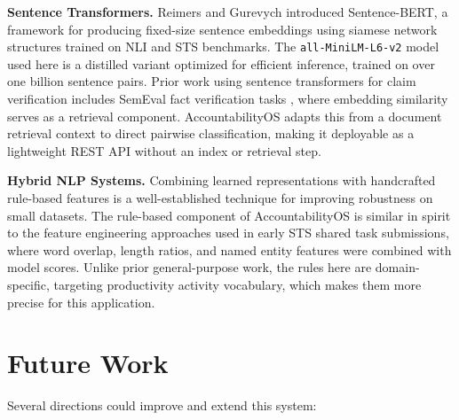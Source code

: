 \documentclass[11pt]{article}
\begin{document}
\textbf{Sentence Transformers.} Reimers and Gurevych \cite{reimers2019sbert}
introduced Sentence-BERT, a framework for producing fixed-size sentence embeddings
using siamese network structures trained on NLI and STS benchmarks. The
\texttt{all-MiniLM-L6-v2} model \cite{reimers2021minilm} used here is a distilled
variant optimized for efficient inference, trained on over one billion sentence pairs.
Prior work using sentence transformers for claim verification includes SemEval fact
verification tasks \cite{thorne2018fever}, where embedding similarity serves as a
retrieval component. AccountabilityOS adapts this from a document retrieval context to
direct pairwise classification, making it deployable as a lightweight REST API without
an index or retrieval step.

\textbf{Hybrid NLP Systems.} Combining learned representations with handcrafted
rule-based features is a well-established technique for improving robustness on small
datasets. The rule-based component of AccountabilityOS is similar in spirit to the
feature engineering approaches used in early STS shared task submissions, where word
overlap, length ratios, and named entity features were combined with model scores.
Unlike prior general-purpose work, the rules here are domain-specific, targeting
productivity activity vocabulary, which makes them more precise for this application.

\section{Future Work}

Several directions could improve and extend this system:
\end{document}
